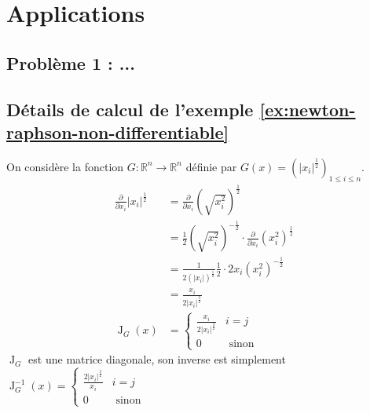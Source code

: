 \documentclass[3p, twocolumn]{elsarticle}
\DeclareMathOperator{\Jacobian}{J}
\begin{document}
\section{Applications}
\subsection{Problème 1 : ...}
\cleardoublepage
\begin{appendices}
    \section{Détails de calcul de l'exemple \ref{ex:newton-raphson-non-differentiable}}
    \label{ap:calcul-exemple-nr}
    On considère la fonction $G:\mathbb R^n\rightarrow \mathbb R^n$ définie par $G(x)=\left(\lvert x_i\rvert^{\frac12}\right)_{1\leq i\leq n}$.
    \begin{align*}
        \frac{\partial}{\partial x_i}\lvert x_i\rvert^{\frac12} & = \frac{\partial}{\partial x_i}\left(\sqrt{x_i^2}\right)^{\frac12}                                          \\
                                                                & = \frac12\left(\sqrt{x_i^2}\right)^{-\frac12}\cdot\frac{\partial}{\partial x_i}\left(x_i^2\right)^{\frac12} \\
                                                                & = \frac1{2(\lvert x_i\rvert)^{\frac12}}\frac12\cdot2x_i(x_i^2)^{-\frac12}                                   \\
                                                                & = \frac{x_i}{2\lvert x_i\rvert^{\frac32}}                                                                   \\
        \Jacobian_G(x)                                          & = \begin{cases}
            \frac{x_i}{2\lvert x_i\rvert^{\frac32}} & i=j             \\
            0                                       & \textrm{ sinon}
        \end{cases}
    \end{align*}
    $\Jacobian_G$ est une matrice diagonale, son inverse est simplement $\Jacobian^{-1}_G(x)=\begin{cases}\frac{2\lvert x_i\rvert^{\frac32}}{x_i}&i=j\\0&\textrm{ sinon}\end{cases}$


\end{appendices}
\end{document}
